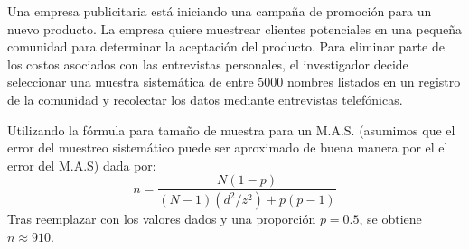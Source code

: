 
\addpoints

\question[15] Una empresa publicitaria está iniciando una campaña de promoción para un nuevo producto. La empresa quiere muestrear clientes potenciales en una pequeña comunidad para determinar la aceptación del producto. Para eliminar parte de los costos asociados con las entrevistas personales, el investigador decide seleccionar una muestra sistemática de entre $5000$ nombres listados en un registro de la comunidad y recolectar los datos mediante entrevistas telefónicas.

\noaddpoints
{}

\begin{solution}
Utilizando la fórmula para tamaño de muestra para un M.A.S. (asumimos que el error del muestreo sistemático puede ser aproximado de buena manera por el el error del M.A.S) dada por:
$$n=\dfrac{N(1-p)}{(N-1)(d^2/z^2)+p(p-1)}$$
Tras reemplazar con los valores dados y una proporción $p=0.5$, se obtiene $n\approx 910$.
\end{solution}